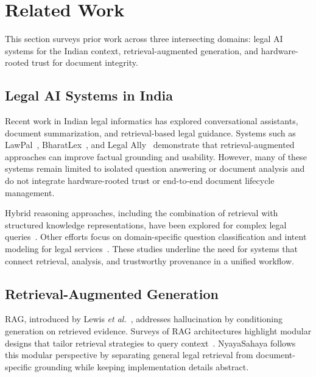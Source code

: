 \section{Related Work}
\label{sec:related_work}

This section surveys prior work across three intersecting domains: legal AI systems for the Indian context, retrieval-augmented generation, and hardware-rooted trust for document integrity.

\subsection{Legal AI Systems in India}

Recent work in Indian legal informatics has explored conversational assistants, document summarization, and retrieval-based legal guidance. Systems such as LawPal~\cite{panchal2025lawpal}, BharatLex~\cite{bharatlex2025}, and Legal Ally~\cite{borikar2025legalally} demonstrate that retrieval-augmented approaches can improve factual grounding and usability. However, many of these systems remain limited to isolated question answering or document analysis and do not integrate hardware-rooted trust or end-to-end document lifecycle management.

Hybrid reasoning approaches, including the combination of retrieval with structured knowledge representations, have been explored for complex legal queries~\cite{sindhuja2025smartlegal}. Other efforts focus on domain-specific question classification and intent modeling for legal services~\cite{ramesh2025judicial}. These studies underline the need for systems that connect retrieval, analysis, and trustworthy provenance in a unified workflow.

\subsection{Retrieval-Augmented Generation}

RAG, introduced by Lewis \textit{et al.}~\cite{lewis2020rag}, addresses hallucination by conditioning generation on retrieved evidence. Surveys of RAG architectures highlight modular designs that tailor retrieval strategies to query context~\cite{gao2024ragsurvey}. NyayaSahaya follows this modular perspective by separating general legal retrieval from document-specific grounding while keeping implementation details abstract.

